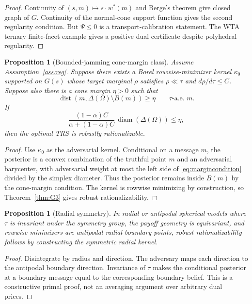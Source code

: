 \documentclass[11pt]{article}
\newtheorem{proposition}[theorem]{Proposition}
\theoremstyle{definition}
\theoremstyle{remark}
\newcommand{\Om}{\Omega}
\begin{document}
\begin{proof}
Continuity of $(s,m)\mapsto s\cdot w^*(m)$ and Berge's theorem give closed graph of $G$. Continuity of the normal-cone support function gives the second regularity condition. But $\Psi\le0$ is a transport-calibration statement. The WTA ternary finite-facet example gives a positive dual certificate despite polyhedral regularity.
\end{proof}

\begin{proposition}[Bounded-jamming cone-margin class]\label{prop:P2}
Assume Assumption~\ref{ass:reg}. Suppose there exists a Borel rowwise-minimizer kernel $\kappa_0$ supported on $G(s)$ whose target marginal $\rho$ satisfies $\rho\ll\tau$ and $d\rho/d\tau\le C$. Suppose also there is a cone margin $\eta>0$ such that
\[
  \operatorname{dist}(m,\Delta(\Om)\setminus B(m))\ge\eta
  \qquad \tau\text{-a.e. }m.
\]
If
\begin{equation}\label{eq:margincondition}
  \frac{(1-\alpha)C}{\alpha+(1-\alpha)C}\,\operatorname{diam}(\Delta(\Om))\le \eta,
\end{equation}
then the optimal TRS is robustly rationalizable.
\end{proposition}

\begin{proof}
Use $\kappa_0$ as the adversarial kernel. Conditional on a message $m$, the posterior is a convex combination of the truthful point $m$ and an adversarial barycenter, with adversarial weight at most the left side of \eqref{eq:margincondition} divided by the simplex diameter. Thus the posterior remains inside $B(m)$ by the cone-margin condition. The kernel is rowwise minimizing by construction, so Theorem~\ref{thm:G3} gives robust rationalizability.
\end{proof}

\begin{proposition}[Radial symmetry]\label{prop:P4}
In radial or antipodal spherical models where $\tau$ is invariant under the symmetry group, the payoff geometry is equivariant, and rowwise minimizers are antipodal radial boundary points, robust rationalizability follows by constructing the symmetric radial kernel.
\end{proposition}

\begin{proof}
Disintegrate by radius and direction. The adversary maps each direction to the antipodal boundary direction. Invariance of $\tau$ makes the conditional posterior at a boundary message equal to the corresponding boundary belief. This is a constructive primal proof, not an averaging argument over arbitrary dual prices.
\end{proof}
\end{document}
